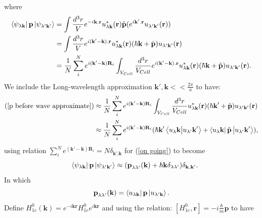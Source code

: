 \documentclass[12pt,english,a4paper]{article}
\begin{document}
	\quad where
	\begin{align}
		\bra{\psi_{\lambda\textbf{k}}}\textbf{p}\ket{\psi_{\lambda'\textbf{k}'}} &= \int \frac{d^3 r}{V} e^{-i\textbf{k}.\textbf{r}}u^{*}_{\lambda \textbf{k}}(\textbf{r}) \hat{\textbf{p}}(e^{i\textbf{k}'.\textbf{r}} u_{\lambda'\textbf{k}'}(\textbf{r})) \nonumber \\
		& =	\int \frac{d^3 r}{V} e^{i(\textbf{k}'-\textbf{k}).\textbf{r}}u^{*}_{\lambda \textbf{k}}(\textbf{r}) (\hbar \textbf{k}+\hat{\textbf{p}}) u_{\lambda'\textbf{k}'}(\textbf{r}) \nonumber \\
		\label{p before wave approximate}
		& = \frac{1}{N} \sum_{i}^{N} e^{i(\textbf{k}'-\textbf{k})\textbf{R}_i} \int_{V_{Cell}} \frac{d^3r}{V_{Cell}}e^{i(\textbf{k}'-\textbf{k}).\textbf{r}}u^{*}_{\lambda \textbf{k}}(\textbf{r}) (\hbar \textbf{k}+\hat{\textbf{p}}) u_{\lambda'\textbf{k}'}(\textbf{r}).
	\end{align}
\quad We include the Long-wavelength approximation $\textbf{k}',\textbf{k} << \frac{2\pi}{a}$ to have:
	\begin{align}
		(\ref{p before wave approximate}) &\approx \frac{1}{N} \sum_{i}^{N} e^{i(\textbf{k}'-\textbf{k})\textbf{R}_i} \int_{V_{Cell}} \frac{d^3r}{V_{Cell}}u^{*}_{\lambda \textbf{k}}(\textbf{r}) (\hbar \textbf{k}'+\hat{\textbf{p}}) u_{\lambda'\textbf{k}'}(\textbf{r})\nonumber \\
		& \approx \frac{1}{N} \sum_{i}^{N} e^{i(\textbf{k}'-\textbf{k})\textbf{R}_i} (\hbar \textbf{k}' \bra{u_\lambda \textbf{k}} \ket{u_{\lambda'}\textbf{k}'} + \bra{u_\lambda \textbf{k}} \hat{\textbf{p}}\ket{u_{\lambda'}\textbf{k}'}),
		\label{on going}
	\end{align}
	\quad using relation $
\sum_{i}^{N} e^{(\textbf{k}'-\textbf{k})\textbf{R}_i}= N\delta_{\textbf{k'},\textbf{k}}$ for (\ref{on going}) to become
	\begin{equation}
		\label{p after LWA}
		\quad \bra{\psi_{\lambda\textbf{k}}}\textbf{p}\ket{\psi_{\lambda'\textbf{k}'}} \approx (\textbf{p}_{\lambda\lambda'}(\textbf{k}) + \hbar \textbf{k} \delta_{\lambda\lambda'}) \delta_{\textbf{k}, \textbf{k}'}.
	\end{equation}
	\quad In which
	\begin{equation}
		\textbf{p}_{\lambda\lambda'}(\textbf{k}) = \bra{u_{\lambda\textbf{k}}}\textbf{p}\ket{u_{\lambda'\textbf{k}}}.
	\end{equation}
	\quad Define $H^0_{1e}(\textbf{k})= e^{-i\textbf{k}\textbf{r}} H^{0}_{1e} e^{i\textbf{k}\textbf{r}}$ and using the relation: $[H^0_{1e},\textbf{r}] = -i\frac{\hbar}{m}\textbf{p}$ to have
\end{document}
